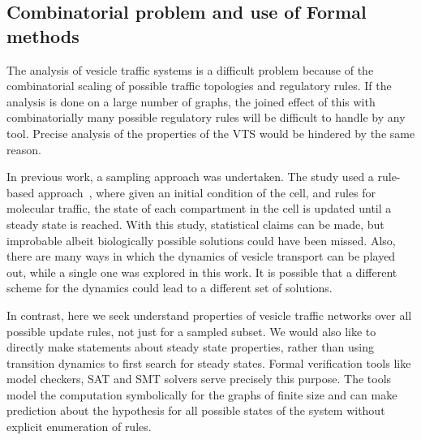 \subsection{Combinatorial problem and use of Formal methods}
\noindent The analysis of vesicle traffic systems is a difficult problem
because of the combinatorial scaling of possible traffic topologies and regulatory rules. 
%
%
If the analysis is done on a large number of graphs, the joined effect of this with combinatorially many possible regulatory rules will be difficult to handle by any tool.
%
Precise analysis of the properties of the VTS would be hindered by the same reason. 

In previous work, a sampling approach was undertaken. 
%
The study used a rule-based approach~\cite{mani2016stacking}, where given an initial condition of the cell, and rules for molecular traffic, the state of each compartment in the cell is updated until a steady state is reached. 
%
With this study, statistical claims can be made, but improbable albeit biologically possible solutions could have been missed.
%
Also, there are many ways in which the dynamics of vesicle transport can be played out, while a single one was explored in this work. 
%
It is possible that a different scheme for the dynamics could lead to a different set of solutions.

%
%
%
%
%
%
%
%

In contrast, here we seek understand properties of vesicle traffic networks over all possible update rules, not just for a sampled subset. 
%
We would also like to directly make statements about steady state properties, rather
than using transition dynamics to first search for steady states. 
%
Formal verification tools like model checkers, SAT and SMT solvers serve precisely this purpose. 
%
The tools model the computation symbolically for the graphs of finite size and can make prediction about the hypothesis for all possible states of the system without explicit enumeration of rules. 
%

